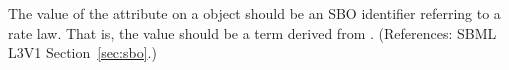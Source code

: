 The value of the attribute  on a \KineticLaw object should
be an SBO identifier referring to a rate law.  That is, the value should be
a term derived from \sboratelaw.  (References: SBML L3V1
Section~\ref{sec:sbo}.)
